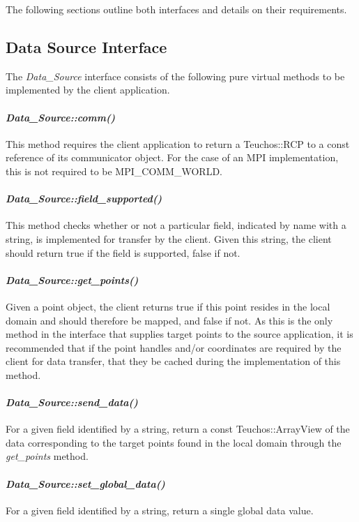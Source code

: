 \documentclass[letterpaper]{article}
\begin{document}
The following sections outline both interfaces and details on their
requirements. 

\subsection{Data Source Interface}

The {\sl Data\_Source} interface consists of the following pure
virtual methods to be implemented by the client application.

\paragraph{\sl Data\_Source::comm()}
This method requires the client application to return a Teuchos::RCP
to a const reference of its communicator object. For the case of an
MPI implementation, this is not required to be MPI\_COMM\_WORLD.

\paragraph{\sl Data\_Source::field\_supported()}
This method checks whether or not a particular field, indicated by
name with a string, is implemented for transfer by the client. Given
this string, the client should return true if the field is supported,
false if not.

\paragraph{\sl Data\_Source::get\_points()}
Given a point object, the client returns true if this point resides in
the local domain and should therefore be mapped, and false if not. As
this is the only method in the interface that supplies target points
to the source application, it is recommended that if the point handles
and/or coordinates are required by the client for data transfer, that
they be cached during the implementation of this method.

\paragraph{\sl Data\_Source::send\_data()}
For a given field identified by a string, return a const
Teuchos::ArrayView of the data corresponding to the target points
found in the local domain through the {\sl get\_points} method.

\paragraph{\sl Data\_Source::set\_global\_data()}
For a given field identified by a string, return a single global data
value.
\end{document}
